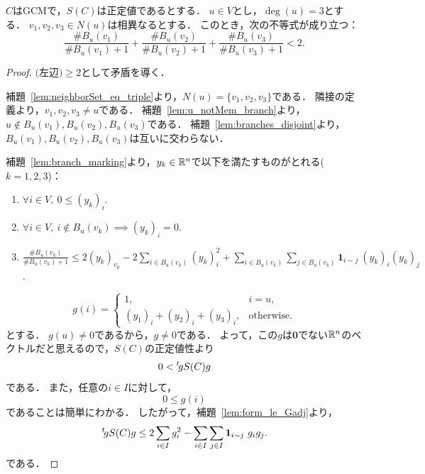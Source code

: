 \begin{lemma}
  \label{lem:schur_ineq}
  \leanok
  $C$はGCMで，$S(C)$は正定値であるとする．
  $u \in V$とし，$\deg(u) = 3$とする．
  $v_1, v_2, v_3 \in N(u)$は相異なるとする．
  このとき，次の不等式が成り立つ：
  \begin{equation}
    \frac{\# B_u(v_1)}{\# B_u(v_1) + 1} + \frac{\# B_u(v_2)}{\# B_u(v_2) + 1} + \frac{\# B_u(v_3)}{\# B_u(v_3) + 1}
    < 2.
  \end{equation}
\end{lemma}

\begin{proof}
  $\textrm{(左辺)} \ge 2$として矛盾を導く．

  補題~\ref{lem:neighborSet_eq_triple}より，$N(u) = \{v_1, v_2, v_3\}$である．
  隣接の定義より，$v_1, v_2, v_3 \ne u$である．
  補題~\ref{lem:u_notMem_branch}より，$u \notin B_u(v_1), B_u(v_2), B_u(v_3)$である．
  補題~\ref{lem:branches_disjoint}より，$B_u(v_1), B_u(v_2), B_u(v_3)$は互いに交わらない．

  補題~\ref{lem:branch_marking}より，$y_k \in \mathbb{R}^n$で以下を満たすものがとれる($k = 1, 2, 3$)：
  \begin{enumerate}[label = (y\arabic*)]
    \item $\forall i \in V,\ 0 \le (y_k)_i$.
    \item $\forall i \in V,\ i \notin B_u(v_k) \implies (y_k)_i = 0$.
    \setcounter{enumi}{3}
    \item $\displaystyle \frac{\# B_u(v_k)}{\# B_u(v_k) + 1} \le 2 (y_k)_{v_k} - 2 \sum_{i \in B_u(v_k)} (y_k)_i ^ 2 + \sum_{i \in B_u(v_k)} \sum_{j \in B_u(v_k)} \bm{1}_{i \sim j}\ (y_k)_i (y_k)_j$. \label{enum:y4'}
  \end{enumerate}

  \begin{equation}
    g(i) = \begin{cases}
      1, & i = u, \\
      (y_1)_i + (y_2)_i + (y_3)_i, & \textrm{otherwise}.
    \end{cases}
  \end{equation}
  とする．
  $g(u) \ne 0$であるから，$g \ne 0$である．
  よって，この$g$は$\bm{0}$でない$\mathbb{R}^n$のベクトルだと思えるので，$S(C)$の正定値性より
  \begin{equation}
    0 < {}^t\!g S(C) g
  \end{equation}
  である．
  また，任意の$i \in I$に対して，
  \begin{equation}
    0 \le g(i)
  \end{equation}
  であることは簡単にわかる．
  したがって，補題~\ref{lem:form_le_Gadj}より，
  \begin{equation} \label{eq:hle}
    {}^t\!g S(C) g
    \le 2 \sum_{i \in I} g_i ^ 2 - \sum_{i \in I} \sum_{j \in I} \bm{1}_{i \sim j}\ g_i g_j.
  \end{equation}
  である．


\end{proof}
